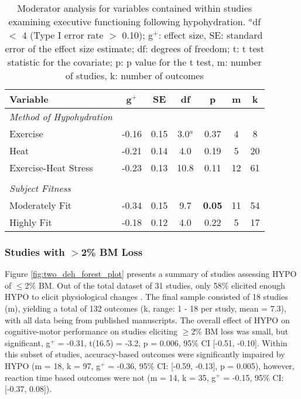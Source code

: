 \begin{table}
	\caption{Moderator analysis for variables contained within studies examining executive functioning following hypohydration. ${^a}$df ${<}$ 4 (Type I error rate ${>}$ 0.10); g${^+}$: effect size, SE: standard error of the effect size estimate; df: degrees of freedom; t: t test statistic for the covariate; p: p value for the t test, m: number of studies, k: number of outcomes}
	\centering
	\begin{tabular}{lcccccc} 
		\hline
		\textbf{Variable} & \textbf{g${^+}$} & \textbf{SE} & \textbf{df} & \textbf{p} & \textbf{m} & 
		\textbf{k} \\
		\hline
		\textit{Method of Hypohydration} &&&&&& \\
		Exercise & -0.16 & 0.15 & 3.0${^a}$ & 0.37 & 4 & 8 \\
		Heat & -0.21 & 0.14 & 4.0 & 0.19 & 5 & 20 \\ 
		Exercise-Heat Stress & -0.23 & 0.13 & 10.8 & 0.11 & 12 & 61 \\
		&&&&&& \\
		\textit{Subject Fitness} &&&&&& \\
		Moderately Fit & -0.34 & 0.15 & 9.7 & \textbf{0.05} & 11 & 54 \\
		Highly Fit & -0.18 & 0.12 & 4.0 & 0.22 & 5 & 17 \\
		\hline		    
	\end{tabular}
	\label{tbl:ex_func_moderators}
\end{table}

\subsubsection{Studies with ${>}$2\% BM Loss}
Figure \ref{fig:two_deh_forest_plot} presents a summary of studies assessing HYPO of ${\leq}$2\% BM. Out of the total dataset of 31 studies, only 58\% elicited enough HYPO to elicit physiological changes \cite{cheuvront_dehydration:_2014}. The final sample consisted of 18 studies (m), yielding a total of 132 outcomes (k, range: 1 - 18 per study, mean = 7.3), with all data being from published manuscripts. The overall effect of HYPO on cognitive-motor performance on studies eliciting ${\geq}$2\% BM loss was small, but significant, g${^+}$ =  -0.31, t(16.5) = -3.2, p = 0.006, 95\% CI [-0.51, -0.10]. Within this subset of studies, accuracy-based outcomes were significantly impaired by HYPO (m = 18, k = 97, g${^+}$ = -0.36, 95\% CI: [-0.59, -0.13], p = 0.005), however, reaction time based outcomes were not (m = 14, k = 35, g${^+}$ = -0.15, 95\% CI:[-0.37, 0.08]).

